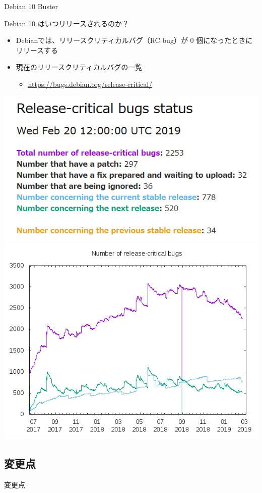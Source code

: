 \begin{frame}{Debian 10 Buster}%

Debian 10 はいつリリースされるのか？

\begin{itemize}
\item Debianでは、リリースクリティカルバグ（RC bug）が 0 個になったときにリリースする
\item 現在のリリースクリティカルバグの一覧
  \begin{itemize}
  \item \url{https://bugs.debian.org/release-critical/}
  \end{itemize}
\end{itemize}

\begin{center}
  \includegraphics[width=0.5\hsize]{image201902/debian-rcbug-1_20190220.png}
  \includegraphics[width=0.5\hsize]{image201902/debian-rcbug-2_20190220.png}
\end{center}

\end{frame}


\subsection{変更点}

\begin{frame}
  \begin{center}\Huge{変更点}\end{center}
\end{frame}


